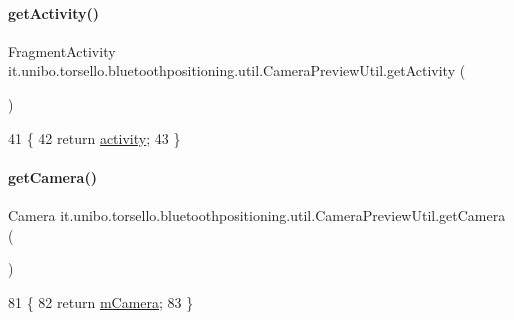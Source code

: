 \paragraph{\texorpdfstring{get\+Activity()}{getActivity()}}
{\footnotesize\ttfamily Fragment\+Activity it.\+unibo.\+torsello.\+bluetoothpositioning.\+util.\+Camera\+Preview\+Util.\+get\+Activity (\begin{DoxyParamCaption}{ }\end{DoxyParamCaption})}


\begin{DoxyCode}
41                                           \{
42         \textcolor{keywordflow}{return} \hyperlink{classit_1_1unibo_1_1torsello_1_1bluetoothpositioning_1_1util_1_1CameraPreviewUtil_ab3f45258d2ab144fd4be5db55d278c42_ab3f45258d2ab144fd4be5db55d278c42}{activity};
43     \}
\end{DoxyCode}
\hypertarget{classit_1_1unibo_1_1torsello_1_1bluetoothpositioning_1_1util_1_1CameraPreviewUtil_a24b83bd2a152f8f12824ccf190a90369_a24b83bd2a152f8f12824ccf190a90369}{}\label{classit_1_1unibo_1_1torsello_1_1bluetoothpositioning_1_1util_1_1CameraPreviewUtil_a24b83bd2a152f8f12824ccf190a90369_a24b83bd2a152f8f12824ccf190a90369} 
\paragraph{\texorpdfstring{get\+Camera()}{getCamera()}}
{\footnotesize\ttfamily Camera it.\+unibo.\+torsello.\+bluetoothpositioning.\+util.\+Camera\+Preview\+Util.\+get\+Camera (\begin{DoxyParamCaption}{ }\end{DoxyParamCaption})}


\begin{DoxyCode}
81                               \{
82         \textcolor{keywordflow}{return} \hyperlink{classit_1_1unibo_1_1torsello_1_1bluetoothpositioning_1_1util_1_1CameraPreviewUtil_a7ee402da8ec64412f9a68e68b4025eea_a7ee402da8ec64412f9a68e68b4025eea}{mCamera};
83     \}
\end{DoxyCode}
\hypertarget{classit_1_1unibo_1_1torsello_1_1bluetoothpositioning_1_1util_1_1CameraPreviewUtil_a7bfe209167872194f9237f51ece4cbf7_a7bfe209167872194f9237f51ece4cbf7}{}\label{classit_1_1unibo_1_1torsello_1_1bluetoothpositioning_1_1util_1_1CameraPreviewUtil_a7bfe209167872194f9237f51ece4cbf7_a7bfe209167872194f9237f51ece4cbf7} 

